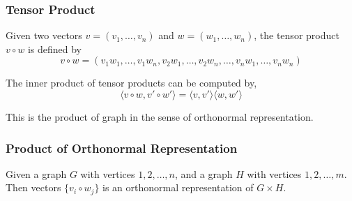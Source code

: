 \documentclass{beamer}
\begin{document}
                  \begin{frame}
                        \frametitle{Tensor Product}
                        \begin{definition}\label{def:tensorProduct}
                              Given two vectors $ v = \left(v_{1},\dots,v_{n}\right) $ and $ w = \left(w_{1},\dots,w_{n}\right) $, the tensor product $ v \circ w $ is defined by
                              \begin{equation}
                                    v \circ w = \left(
                                          v_{1}w_{1},\dots,v_{1}w_{n},
                                          v_{2}w_{1},\dots,v_{2}w_{n},
                                          \dots,
                                          v_{n}w_{1},\dots,v_{n}w_{n}
                                          \right)
                              \end{equation}
                        \end{definition}

                        \pause

                        \begin{lemma}
                              The inner product of tensor products can be computed by,
                              \begin{equation}
                                    \langle v \circ w, v' \circ w' \rangle = \langle v, v' \rangle \langle w, w' \rangle
                              \end{equation}
                        \end{lemma}

                  \end{frame}

                  \begin{frame}
                        This is the product of graph in the sense of orthonormal representation.

                        \frametitle{Product of Orthonormal Representation}
                        \begin{lemma}
                              Given a graph $ G $ with vertices $ 1,2,\dots,n $, and a graph $ H $ with vertices $ 1,2,\dots,m $. Then vectors $\{ v_{i}\circ w_{j} \}$ is an orthonormal representation of $ G \times H $.
                        \end{lemma}
                  \end{frame}
\end{document}

